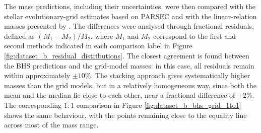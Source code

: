 The mass predictions, including their uncertainties, were then compared with the stellar evolutionary-grid estimates based on PARSEC \citep{bressan2012} and with the linear-relation masses presented by \citet{moya2018}. The differences were analysed through fractional residuals, defined as $(M_1-M_2)/M_2$, where $M_1$ and $M_2$ correspond to the first and second methods indicated in each comparison label in Figure \ref{fig:dataset_b_residual_distributions}. The closest agreement is found between the BHS predictions and the grid-model masses: in this case, all residuals remain within approximately $\pm 10\%$. The stacking approach gives systematically higher masses than the grid models, but in a relatively homogeneous way, since both the mean and the median lie close to each other, near a fractional difference of $+2\%$. The corresponding $1:1$ comparison in Figure \ref{fig:dataset_b_bhs_grid_1to1} shows the same behaviour, with the points remaining close to the equality line across most of the mass range.

